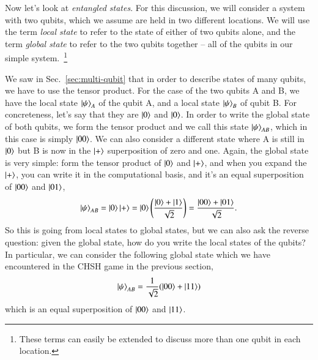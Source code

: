 Now let's look at \emph{entangled states}.  For this discussion, we will consider a system with two qubits, which we assume are held in two different locations.  We will use the term \emph{local state} to refer to the state of either of two qubits alone, and the term \emph{global state} to refer to the two qubits together -- all of the qubits in our simple system.~\footnote{These terms can easily be extended to discuss more than one qubit in each location.}

We saw in Sec.~\ref{sec:multi-qubit} that in order to describe states of many qubits, we have to use the tensor product. For the case of the two qubits A and B, we have the local state $\left| \psi \right\rangle_A$ of the qubit A, and a local state $\left| \psi \right\rangle_B$ of qubit B. For concreteness, let's say that they are $\left| 0 \right\rangle$ and $\left| 0 \right\rangle$. In order to write the global state of both qubits, we form the tensor product and we call this state $\left| \psi \right\rangle_{AB}$, which in this case is simply $\left| 00 \right\rangle$. We can also consider a different state where A is still in $\left| 0 \right\rangle$ but B is now in the $\left| + \right\rangle$ superposition of zero and one. Again, the global state is very simple: form the tensor product of $\left| 0 \right\rangle$ and $\left| + \right\rangle$, and when you expand the $\left| + \right\rangle$, you can write it in the computational basis, and it's an equal superposition of $\left| 00 \right\rangle$ and $\left| 01 \right\rangle$,
\begin{equation}
\left| \psi \right\rangle_{AB} = \left| 0 \right\rangle\left| + \right\rangle = \left| 0 \right\rangle\left(\frac{\left| 0 \right\rangle + \left| 1 \right\rangle}{\sqrt{2}}\right) = \frac{\left| 00 \right\rangle + \left| 01 \right\rangle}{\sqrt2}.
\end{equation}
So this is going from local states to global states, but we can also ask the reverse question: given the global state, how do you write the local states of the qubits? In particular, we can consider the following global state which we have encountered in the CHSH game in the previous section,
\begin{equation}
\left| \psi \right\rangle_{AB} = \frac{1}{\sqrt2}(\left| 00 \right\rangle + \left| 11 \right\rangle)
\end{equation}
which is an equal superposition of $\left| 00 \right\rangle$ and $\left| 11 \right\rangle$.

